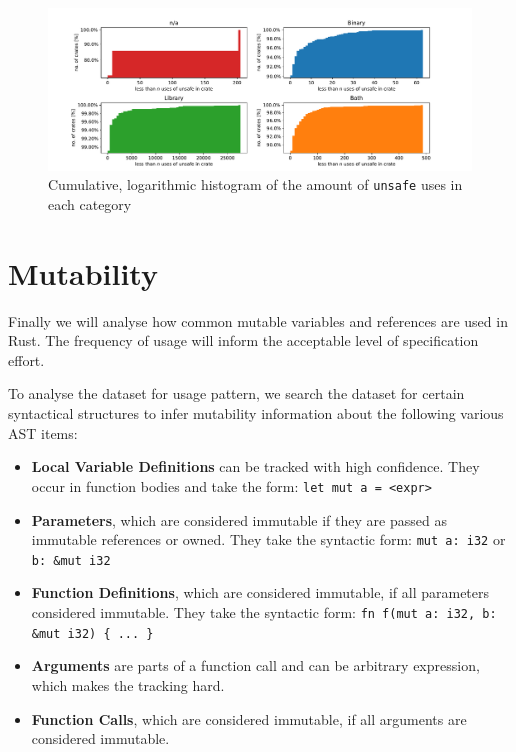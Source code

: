 \documentclass{book}
\newcommand{\code}[1]{\texttt{#1}}
\theoremstyle{definition}
\begin{document}
\begin{figure}[h]
	\centering
	\includegraphics[width=0.99\linewidth, clip, trim={0.2cm 0.2cm 0.2cm 0.2cm}]{../unsafe_counts_by_crate_type.pdf}
	\caption{Cumulative, logarithmic histogram of the amount of \code{unsafe} uses in each category}
	\label{fig:unsafe-hist}
\end{figure}


\section{Mutability}

Finally we will analyse how common mutable variables and references are used in Rust. 
The frequency of usage will inform the acceptable level of specification effort.

To analyse the dataset for usage pattern, we search the dataset for certain syntactical structures to infer mutability information about the following various AST items:
\begin{itemize}
	\item \textbf{Local Variable Definitions} can be tracked with high confidence. They occur in function bodies and take the form: \code{let mut a = <expr>}
	\item \textbf{Parameters}, which are considered immutable if they are passed as immutable references or owned. They take the syntactic form: \code{mut a: i32} or \code{b: \&mut i32}
	\item \textbf{Function Definitions}, which are considered immutable, if all parameters considered immutable. They take the syntactic form: \code{fn f(mut a: i32, b: \&mut i32) \{ ... \}}
	\item \textbf{Arguments} are parts of a function call and can be arbitrary expression, which makes the tracking hard.
	\item \textbf{Function Calls}, which are considered immutable, if all arguments are considered immutable.
\end{itemize}
\end{document}
